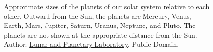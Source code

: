 \begin{figure}[h]
      \begin{center}
      \end{center}
      \captionsetup{width = 1\linewidth}
      \caption{\footnotesize Approximate sizes of the planets of our solar system relative to each other. Outward from the Sun, the planets are Mercury, Venus, Earth, Mars, Jupiter, Saturn, Uranus, Neptune, and Pluto. The planets are not shown at the appropriate distance from the Sun. Author: \href{https://commons.wikimedia.org/wiki/File:Solar_system_scale.jpg}{Lunar and Planetary Laboratory}. Public Domain.}
\end{figure}

